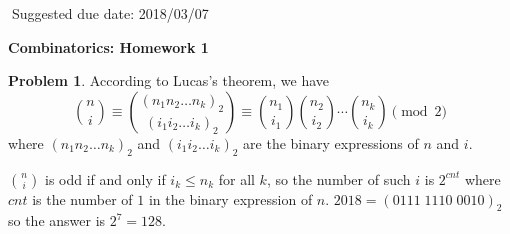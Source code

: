 \documentclass[12pt]{article}
\theoremstyle{definition}
\newtheorem{hw}{Problem}
\begin{document}
	
	$\;$\hfill Suggested due date: 2018/03/07
	
	\bigskip
	
	\begin{center}
		{\LARGE\bf Combinatorics: Homework 1}
	\end{center}
	
	\bigskip
	
	\begin{hw}
		According to Lucas's theorem, we have
		$$
		\binom{n}{i} 
		\equiv \binom{(n_1n_2\dots n_k)_2}{(i_1i_2\dots i_k)_2}
		\equiv \binom{n_1}{i_1}\binom{n_2}{i_2}\cdots\binom{n_k}{i_k} \pmod 2
		$$
		where $(n_1n_2\dots n_k)_2$ and $(i_1i_2\dots i_k)_2$ are the binary expressions of $n$ and $i$.
		
		$\binom{n}{i}$ is odd if and only if $i_k \leq n_k$ for all $k$, so the number of such $i$ is $2^{cnt}$ where $cnt$ is the number of $1$ in the binary expression of $n$.
		$2018 = (0111 \; 1110 \; 0010)_2$ so the answer is $2^7 = 128$.
	\end{hw}
	
\end{document}
